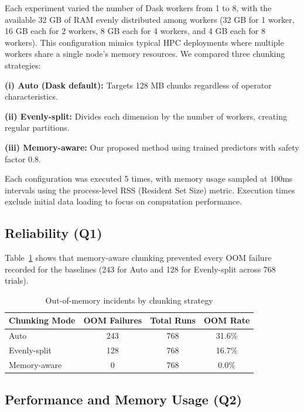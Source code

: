 Each experiment varied the number of Dask workers from 1 to 8, with the available 32 \ac{GB} of \ac{RAM} evenly distributed among workers (32 \ac{GB} for 1 worker, 16 \ac{GB} each for 2 workers, 8 \ac{GB} each for 4 workers, and 4 \ac{GB} each for 8 workers).
This configuration mimics typical \ac{HPC} deployments where multiple workers share a single node's memory resources.
We compared three chunking strategies:

\textbf{(i) Auto (Dask default):} Targets 128 \ac{MB} chunks regardless of operator characteristics.

\textbf{(ii) Evenly-split:} Divides each dimension by the number of workers, creating regular partitions.

\textbf{(iii) Memory-aware:} Our proposed method using trained predictors with safety factor 0.8.

Each configuration was executed 5 times, with memory usage sampled at 100ms intervals using the process-level \ac{RSS} (Resident Set Size) metric.
Execution times exclude initial data loading to focus on computation performance.

\subsection{Reliability (Q1)}

Table~\ref{tab:oom-analysis} shows that memory-aware chunking prevented every \ac{OOM} failure recorded for the baselines (243 for Auto and 128 for Evenly-split across 768 trials).

\begin{table}[htb]
    \centering
    \caption{Out-of-memory incidents by chunking strategy}
    \label{tab:oom-analysis}
    \begin{tabular}{lccc}
        \toprule
        \textbf{Chunking Mode} & \textbf{\ac{OOM} Failures} & \textbf{Total Runs} & \textbf{\ac{OOM} Rate} \\
        \midrule
        Auto & 243 & 768 & 31.6\% \\
        Evenly-split & 128 & 768 & 16.7\% \\
        Memory-aware & 0 & 768 & 0.0\% \\
        \bottomrule
    \end{tabular}
\end{table}

\subsection{Performance and Memory Usage (Q2)}

